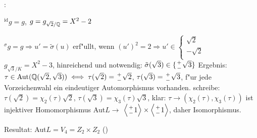 :{
 ${}^{\operatorname{id}}g=g$, $g=g_{\sqrt{2}/\mathbb Q}=X^2-2$
 
 ${}^{\sigma}g=g \Rightarrow u'=\tilde{\sigma}(u)$ erf"ullt, wenn
 $(u')^2=2 \Rightarrow u'\in \begin{cases}
 \sqrt{2}&\\
 -\sqrt{2}\\
 \end{cases}$
 $g_{\sqrt{3}/K}=X^2-3$, hinreichend und notwendig: $\tilde{\sigma}(\sqrt{3})\in
 \{\stack(+;-)\sqrt{3}\}$
 Ergebnis: $\tau \in \operatorname{Aut}(\SetQ(\sqrt{2},\sqrt{3}))\iff \tau(\sqrt{2})=\stack(+;-)\sqrt{2}$,
 $\tau(\sqrt{3})=\stack(+;-)\sqrt{3}$, f"ur jede Vorzeichenwahl ein eindeutiger Automorphismus vorhanden.
 schreibe: $\tau(\sqrt{2})=\chi_2(\tau)\sqrt{2}$, $\tau(\sqrt{3})=\chi_3(\tau)\sqrt{3}$,
 klar: $\tau \longrightarrow (\chi_2(\tau),\chi_3(\tau))$ ist injektiver Homomorphismus Aut$L\longrightarrow$
 $\product{\stack(+;-)1}\times \product{\stack(+;-)1}$, daher Isomorphismus.
 
 Resultat: Aut$L=V_4=Z_2\times Z_2$ () 
 }
